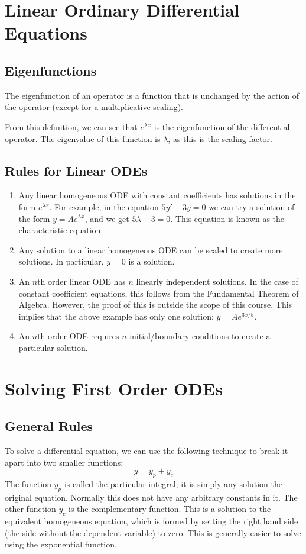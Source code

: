 \documentclass{article}
\begin{document}
\section{Linear Ordinary Differential Equations}
\subsection{Eigenfunctions}
\begin{definition}
	The eigenfunction of an operator is a function that is unchanged by the action of the operator (except for a multiplicative scaling).
\end{definition}
From this definition, we can see that $e^{\lambda x}$ is the eigenfunction of the differential operator. The eigenvalue of this function is $\lambda$, as this is the scaling factor.

\subsection{Rules for Linear ODEs}
\begin{enumerate}
	\item Any linear homogeneous ODE with constant coefficients has solutions in the form $e^{\lambda x}$. For example, in the equation $5y' - 3y = 0$ we can try a solution of the form $y = Ae^{\lambda x}$, and we get $5 \lambda - 3 = 0$. This equation is known as the characteristic equation.
	\item Any solution to a linear homogeneous ODE can be scaled to create more solutions. In particular, $y=0$ is a solution.
	\item An $n$th order linear ODE has $n$ linearly independent solutions. In the case of constant coefficient equations, this follows from the Fundamental Theorem of Algebra. However, the proof of this is outside the scope of this course. This implies that the above example has only one solution: $y = Ae^{3x/5}$.
	\item An $n$th order ODE requires $n$ initial/boundary conditions to create a particular solution.
\end{enumerate}

\section{Solving First Order ODEs}
\subsection{General Rules}
To solve a differential equation, we can use the following technique to break it apart into two smaller functions:
\[ y = y_p + y_c \]
The function $y_p$ is called the particular integral; it is simply any solution
the original equation. Normally this does not have any arbitrary constants in it. The other function $y_c$ is the complementary function. This is a solution to the equivalent homogeneous equation, which is formed by setting the right hand side (the side without the dependent variable) to zero. This is generally easier to solve using the exponential function.
\end{document}
